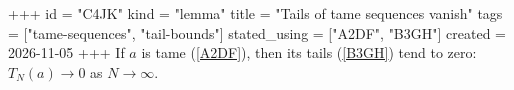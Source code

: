 +++
id = "C4JK"
kind = "lemma"
title = "Tails of tame sequences vanish"
tags = ["tame-sequences", "tail-bounds"]
stated_using = ["A2DF", "B3GH"]
created = 2026-11-05
+++
If $a$ is tame (\ref{A2DF}), then its tails (\ref{B3GH}) tend to zero: $T_N(a) \to 0$ as $N \to \infty$.
